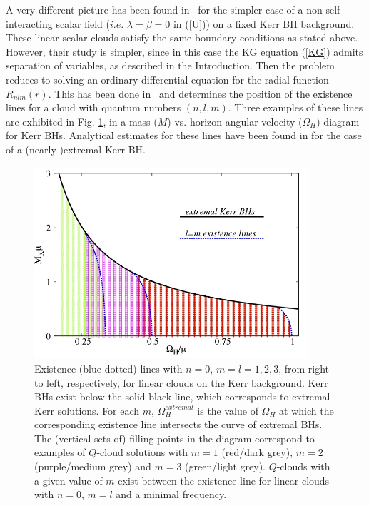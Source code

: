 \bigskip
  
A very different picture has been found in~\cite{Herdeiro:2014goa,Benone:2014ssa}
for the simpler case of a non-self-interacting
scalar field ($i.e.$ $\lambda=\beta=0$ in (\ref{U}))
on a fixed Kerr BH background.
These linear scalar clouds
satisfy the same boundary conditions as stated above.
However, their study is  simpler, since in this case
the KG equation (\ref{KG}) admits separation of variables, as described in the Introduction. 
%
Then the problem reduces to solving
an ordinary differential equation for 
the radial function $R_{nlm}(r)$.
This has been done in~\cite{Herdeiro:2014goa,Benone:2014ssa} and determines the position of the existence lines for a cloud with quantum numbers $(n,l,m)$. Three examples of these lines are exhibited in Fig. \ref{existencelines}, in a mass ($M$) vs. horizon angular velocity ($\Omega_H$) diagram for Kerr BHs.
%
Analytical estimates for these lines have been found in 
\cite{Hod:2012px,Hod:2013zza}
for the case of a (nearly-)extremal Kerr BH.


\begin{figure}[h!]
\centering
\includegraphics[height=2.8in]{papers/QClouds/Mw.jpeg}
\caption{Existence (blue dotted) lines with $n=0$, $m=l=1,2,3$, from right to left, respectively, for linear clouds on the Kerr background.  Kerr BHs exist below the solid black line, which corresponds to extremal Kerr solutions. For each $m$, $\Omega_H^{extremal}$ is the value of $\Omega_H$ at which the corresponding existence line intersects the curve of extremal BHs. The (vertical sets of) filling points in the diagram correspond to examples of $Q$-cloud solutions with $m=1$ (red/dark grey), $m=2$ (purple/medium grey) and $m=3$ (green/light grey). $Q$-clouds with a given value of $m$ exist between the existence line for linear clouds with $n=0$, $m=l$ and a minimal frequency.} 
\label{existencelines}
\end{figure}

